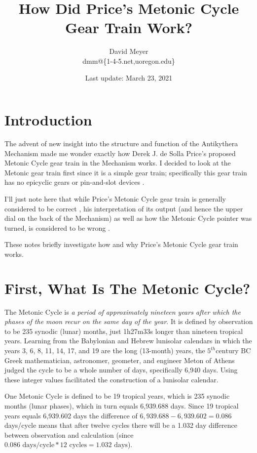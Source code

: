 \documentclass[11pt, oneside]{article}   	%
\title{How Did Price's Metonic Cycle Gear Train Work?}
\author{David Meyer \\ dmm@\{1-4-5.net,uoregon.edu\}}
\date{Last update: March 23, 2021}							%
\theoremstyle{definition}
\begin{document}
\maketitle

\section{Introduction}
The advent of new insight into the structure and function of the Antikythera Mechanism \cite{Freeth2021} made me wonder exactly how 
Derek J. de Solla Price's \cite{wiki:price} proposed Metonic Cycle gear train in the Mechanism works. I decided to look at the Metonic gear 
train first since it is a simple gear train;  specifically this gear train has no epicyclic gears \cite{Wright2005} or pin-and-slot devices \cite{pin_and_slot_device,Evans2010}.

\bigskip
\noindent
I'll just note here that while Price's Metonic Cycle gear train is generally considered to be correct \cite{Freeth2006}, his interpretation of its output
(and hence the upper dial on the back of the Mechanism) as well as how the Metonic Cycle pointer was turned, is considered
to be wrong \cite{challenging_the_classic_research}.

\bigskip
\noindent
These notes briefly investigate how and why Price's Metonic Cycle gear train works.

\section{First, What Is The Metonic Cycle?}
The Metonic Cycle is \emph{a period of approximately nineteen years after which the phases of the moon recur on the same day of the year}. It is defined by 
observation to be 235 synodic (lunar) months,  just 1h27m33s longer than nineteen tropical years. Learning from the Babylonian and Hebrew lunisolar calendars 
in which the years 3, 6, 8, 11, 14, 17, and 19 are the long (13-month) years, the $5^{th} \text{century BC}$ Greek mathematician, 
astronomer, geometer, and engineer Meton of Athens \cite{wiki:menton} judged the cycle to be a whole number of days, specifically 6,940 days. Using these integer 
values facilitated  the construction of a lunisolar calendar.

\bigskip
\noindent
One Metonic Cycle is defined to be 19 tropical years, which is 235 synodic months (lunar phases), which in turn equals 6,939.688 days. Since
19 tropical years equals 6,939.602 days the difference of  $6,939.688 - 6,939.602 = 0.086$ days/cycle means that after twelve cycles there 
will be a 1.032 day difference between observation and calculation (since $0.086 \text{ days/cycle} * 12 \text{ cycles} = 
1.032 \text{ days}$).  
\end{document}
